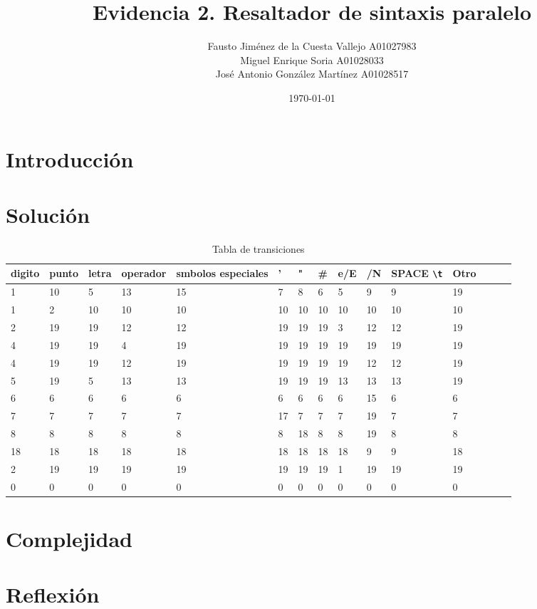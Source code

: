 \documentclass{article}
\title{Evidencia 2. Resaltador de sintaxis paralelo}
\author{Fausto Jiménez de la Cuesta Vallejo A01027983\\
        Miguel Enrique Soria A01028033\\
        José Antonio González Martínez A01028517}
\date{\today}
\begin{document}
\maketitle

\section{Introducción}

\section{Solución}

\begin{table}
\centering
\caption{Tabla de transiciones}
\label{tab:tabla}
\begin{tabular}{l l l l l l l l l l l l l l l}
    \toprule
    digito	& punto	& letra	& operador	& smbolos especiales	 & '	& " 	& \#	& e/E	& /N	& SPACE \verb|\t|	& Otro \\
    \midrule
    1	& 10	& 5	& 13	& 15	& 7	& 8	& 6	& 5	& 9	& 9	& 19 \\
    1	& 2	& 10	& 10	& 10	& 10	& 10	& 10	& 10	& 10	& 10	& 10 \\
    2	& 19	& 19	& 12	& 12	& 19	& 19	& 19	& 3	& 12	& 12	& 19 \\
    4	& 19	& 19	& 4	& 19	& 19	& 19	& 19	& 19	& 19	& 19	& 19 \\
    4	& 19	& 19	& 12	& 19	& 19	& 19	& 19	& 19	& 12	& 12	& 19 \\
    5	& 19	& 5	& 13	& 13	& 19	& 19	& 19	& 13	& 13	& 13	& 19 \\
    6	& 6	& 6	& 6	& 6	& 6	& 6	& 6	& 6	& 15	& 6	& 6 \\
    7	& 7	& 7	& 7	& 7	& 17	& 7	& 7	& 7	& 19	& 7	& 7 \\
    8	& 8	& 8	& 8	& 8	& 8	& 18	& 8	& 8	& 19	& 8	& 8 \\
    18	& 18	& 18	& 18	& 18	& 18	& 18	& 18	& 18	& 9	& 9	& 18 \\
    2	& 19	& 19	& 19	& 19	& 19	& 19	& 19	& 1	& 19	& 19	& 19 \\
    0	& 0	& 0	& 0	& 0	& 0	& 0	& 0	& 0	& 0	& 0	& 0 \\
    \bottomrule
\end{tabular}
\end{table}

\section{Complejidad}

\section{Reflexión}
\end{document}
